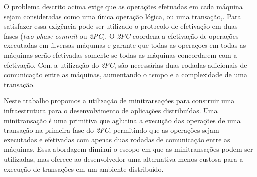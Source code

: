 \documentclass[11pt,twoside,a4paper]{book}
\begin{document}
O problema descrito acima exige que as operações efetuadas em cada máquina sejam consideradas como uma única operação lógica, ou uma transação,. Para satisfazer essa exigência pode ser utilizado o protocolo de efetivação em duas fases (\emph{two-phase commit} ou \emph{2PC}). O \emph{2PC} coordena a efetivação de operações executadas em diversas máquinas e garante que todas as operações em todas as máquinas serão efetivadas somente se todas as máquinas concordarem com a efetivação. Com a utilização do \emph{2PC}, são necessárias duas rodadas adicionais de comunicação entre as máquinas, aumentando o tempo e a complexidade de uma transação.


Neste trabalho propomos a utilização de minitransações para construir uma infraestrutura para o desenvolvimento de aplicações distribuídas. Uma minitransação é uma primitiva que aglutina a execução das operações de uma transação na primeira fase do \emph{2PC}, permitindo que as operações sejam executadas e efetivadas com apenas duas rodadas de comunicação entre as máquinas. Essa abordagem diminui o escopo em que as minitransações podem ser utilizadas, mas oferece ao desenvolvedor uma alternativa menos custosa para a execução de transações em um ambiente distribuído.

\end{document}
